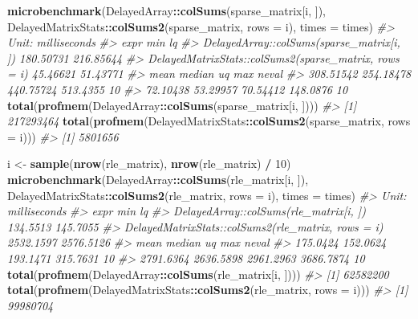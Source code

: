 \documentclass[]{book}
\newenvironment{Shaded}{\begin{snugshade}}{\end{snugshade}}
\newcommand{\KeywordTok}[1]{\textcolor[rgb]{0.13,0.29,0.53}{\textbf{#1}}}
\newcommand{\DataTypeTok}[1]{\textcolor[rgb]{0.13,0.29,0.53}{#1}}
\newcommand{\DecValTok}[1]{\textcolor[rgb]{0.00,0.00,0.81}{#1}}
\newcommand{\StringTok}[1]{\textcolor[rgb]{0.31,0.60,0.02}{#1}}
\newcommand{\CommentTok}[1]{\textcolor[rgb]{0.56,0.35,0.01}{\textit{#1}}}
\newcommand{\OperatorTok}[1]{\textcolor[rgb]{0.81,0.36,0.00}{\textbf{#1}}}
\newcommand{\NormalTok}[1]{#1}
\begin{document}
\begin{Shaded}
\begin{Highlighting}[]
\KeywordTok{microbenchmark}\NormalTok{(DelayedArray}\OperatorTok{::}\KeywordTok{colSums}\NormalTok{(sparse_matrix[i, ]),}
\NormalTok{               DelayedMatrixStats}\OperatorTok{::}\KeywordTok{colSums2}\NormalTok{(sparse_matrix, }\DataTypeTok{rows =}\NormalTok{ i),}
               \DataTypeTok{times =}\NormalTok{ times)}
\CommentTok{#> Unit: milliseconds}
\CommentTok{#>                                                   expr       min        lq}
\CommentTok{#>              DelayedArray::colSums(sparse_matrix[i, ]) 180.50731 216.85644}
\CommentTok{#>  DelayedMatrixStats::colSums2(sparse_matrix, rows = i)  45.46621  51.43771}
\CommentTok{#>       mean    median        uq      max neval}
\CommentTok{#>  308.51542 254.18478 440.75724 513.4355    10}
\CommentTok{#>   72.10438  53.29957  70.54412 148.0876    10}
\KeywordTok{total}\NormalTok{(}\KeywordTok{profmem}\NormalTok{(DelayedArray}\OperatorTok{::}\KeywordTok{colSums}\NormalTok{(sparse_matrix[i, ])))}
\CommentTok{#> [1] 217293464}
\KeywordTok{total}\NormalTok{(}\KeywordTok{profmem}\NormalTok{(DelayedMatrixStats}\OperatorTok{::}\KeywordTok{colSums2}\NormalTok{(sparse_matrix, }\DataTypeTok{rows =}\NormalTok{ i)))}
\CommentTok{#> [1] 5801656}

\NormalTok{i <-}\StringTok{ }\KeywordTok{sample}\NormalTok{(}\KeywordTok{nrow}\NormalTok{(rle_matrix), }\KeywordTok{nrow}\NormalTok{(rle_matrix) }\OperatorTok{/}\StringTok{ }\DecValTok{10}\NormalTok{)}
\KeywordTok{microbenchmark}\NormalTok{(DelayedArray}\OperatorTok{::}\KeywordTok{colSums}\NormalTok{(rle_matrix[i, ]),}
\NormalTok{               DelayedMatrixStats}\OperatorTok{::}\KeywordTok{colSums2}\NormalTok{(rle_matrix, }\DataTypeTok{rows =}\NormalTok{ i),}
               \DataTypeTok{times =}\NormalTok{ times)}
\CommentTok{#> Unit: milliseconds}
\CommentTok{#>                                                expr       min        lq}
\CommentTok{#>              DelayedArray::colSums(rle_matrix[i, ])  134.5513  145.7055}
\CommentTok{#>  DelayedMatrixStats::colSums2(rle_matrix, rows = i) 2532.1597 2576.5126}
\CommentTok{#>       mean    median        uq       max neval}
\CommentTok{#>   175.0424  152.0624  193.1471  315.7631    10}
\CommentTok{#>  2791.6364 2636.5898 2961.2963 3686.7874    10}
\KeywordTok{total}\NormalTok{(}\KeywordTok{profmem}\NormalTok{(DelayedArray}\OperatorTok{::}\KeywordTok{colSums}\NormalTok{(rle_matrix[i, ])))}
\CommentTok{#> [1] 62582200}
\KeywordTok{total}\NormalTok{(}\KeywordTok{profmem}\NormalTok{(DelayedMatrixStats}\OperatorTok{::}\KeywordTok{colSums2}\NormalTok{(rle_matrix, }\DataTypeTok{rows =}\NormalTok{ i)))}
\CommentTok{#> [1] 99980704}
\end{Highlighting}
\end{Shaded}
\end{document}
